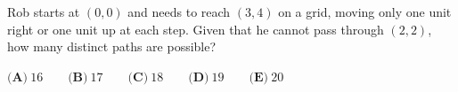 Rob starts at $(0,0)$ and needs to reach $(3,4)$ on a grid, moving only one unit right or one unit up at each step. Given that he cannot pass through $(2,2)$, how many distinct paths are possible?

$\textbf{(A)}\ 16\qquad\textbf{(B)}\ 17\qquad\textbf{(C)}\ 18\qquad\textbf{(D)}\ 19\qquad\textbf{(E)}\ 20$
